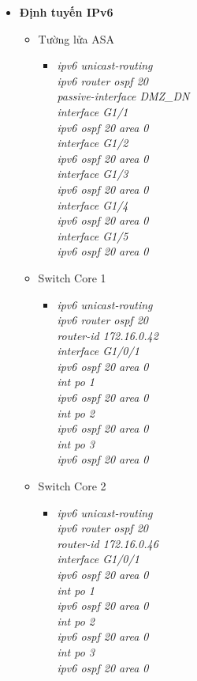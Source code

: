 \documentclass[12pt,a4paper]{report}
\begin{document}
\begin{itemize}
       \item \textbf{Định tuyến IPv6}
      \begin{itemize}
        \item Tường lửa ASA 
        \begin{itemize}
          \item \textit{ipv6 unicast-routing\\
ipv6 router ospf 20\\
passive-interface DMZ\_DN\\
interface G1/1\\
ipv6 ospf 20 area 0\\
interface G1/2\\
ipv6 ospf 20 area 0\\
interface G1/3\\
ipv6 ospf 20 area 0\\
interface G1/4\\
ipv6 ospf 20 area 0\\
interface G1/5\\
ipv6 ospf 20 area 0\\}
       
        \end{itemize}
       
            \item Switch Core 1
           
        \begin{itemize}
         \item \textit{ipv6 unicast-routing\\
ipv6 router ospf 20\\
router-id 172.16.0.42\\
interface G1/0/1\\
ipv6 ospf 20 area 0\\
int po 1\\
ipv6 ospf 20 area 0\\
int po 2\\
ipv6 ospf 20 area 0\\
int po 3\\
ipv6 ospf 20 area 0\\}
        
          \end{itemize}
             \item Switch Core 2
           
        \begin{itemize}
         \item \textit{ipv6 unicast-routing\\
ipv6 router ospf 20\\
router-id 172.16.0.46\\
interface G1/0/1\\
ipv6 ospf 20 area 0\\
int po 1\\
ipv6 ospf 20 area 0\\
int po 2\\
ipv6 ospf 20 area 0\\
int po 3\\
ipv6 ospf 20 area 0\\}
        

\end{itemize}
\end{itemize}
\end{itemize}
\end{document}

